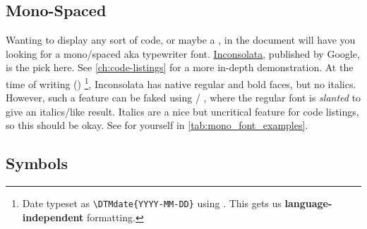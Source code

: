\subsection{Mono-Spaced}
\label{ch:mono-spaced}

Wanting to display any sort of code, or maybe a ,
in the document will have you looking for a mono\-/spaced aka typewriter font.
\href{https://fonts.google.com/specimen/Inconsolata}{Inconsolata}, published by Google,
is the pick here.
See \cref{ch:code-listings} for a more in-depth demonstration.
At the time of writing ()%
\footnote{%
    Date typeset as \texttt{\textbackslash{}DTMdate\{YYYY-MM-DD\}} using
    .
    This gets us \textbf{language-independent}
     formatting.
},
Inconsolata has native regular and bold faces, but no italics.
However, such a feature can be faked using /%
, where the regular font is \emph{slanted} to give an
italics\-/like result.
Italics are a nice but uncritical feature for code listings, so this should be okay.
See for yourself in \cref{tab:mono_font_examples}.

\begin{table}\ContinuedFloat
\end{table}

\subsection{Symbols}

